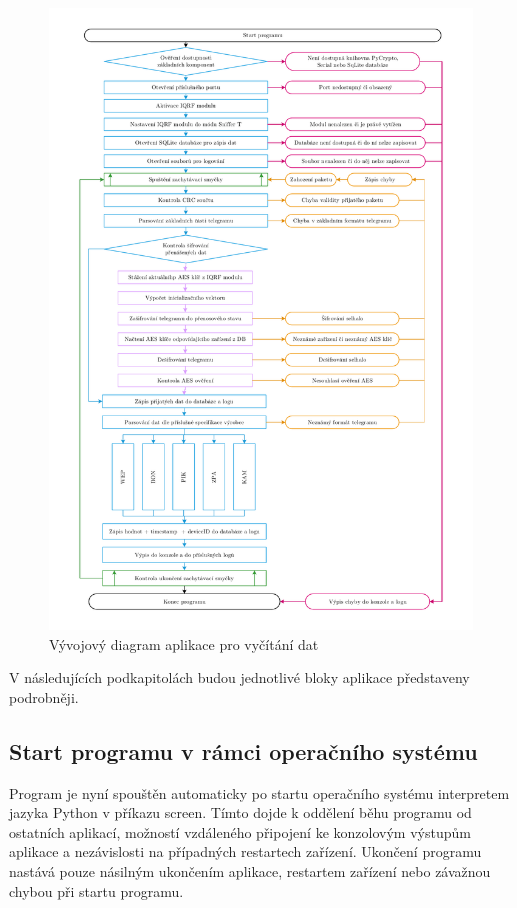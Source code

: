 \begin{figure}[!ht]
  \begin{center}
    \includegraphics[scale=0.55]{obrazky/aplikace_diagram}
  \end{center}
  \caption{Vývojový diagram aplikace pro vyčítání dat}
	\label{AplikaceDiagram}
\end{figure}

V následujících podkapitolách budou jednotlivé bloky aplikace představeny podrobněji.

\subsection{Start programu v rámci operačního systému}
Program je nyní spouštěn automaticky po startu operačního systému interpretem jazyka Python v příkazu screen. Tímto dojde k oddělení běhu programu od ostatních aplikací, možností vzdáleného připojení ke konzolovým výstupům aplikace a nezávislosti na případných restartech zařízení. Ukončení programu nastává pouze násilným ukončením aplikace, restartem zařízení nebo závažnou chybou při startu programu. 

